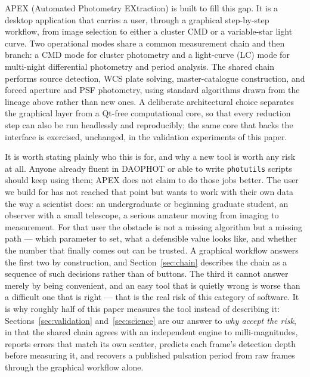 \documentclass[fleqn,usenatbib]{mnras}
\begin{document}
APEX (Automated Photometry EXtraction) is built to fill this gap. It is a desktop application that carries a user, through a graphical step-by-step workflow, from image selection to either a cluster CMD or a variable-star light curve. Two operational modes share a common measurement chain and then branch: a CMD mode for cluster photometry and a light-curve (LC) mode for multi-night differential photometry and period analysis. The shared chain performs source detection, WCS plate solving, master-catalogue construction, and forced aperture and PSF photometry, using standard algorithms drawn from the lineage above rather than new ones. A deliberate architectural choice separates the graphical layer from a Qt-free computational core, so that every reduction step can also be run headlessly and reproducibly; the same core that backs the interface is exercised, unchanged, in the validation experiments of this paper.

It is worth stating plainly who this is for, and why a new tool is worth any risk at all. Anyone already fluent in DAOPHOT or able to write \texttt{photutils} scripts should keep using them; APEX does not claim to do those jobs better. The user we build for has not reached that point but wants to work with their own data the way a scientist does: an undergraduate or beginning graduate student, an observer with a small telescope, a serious amateur moving from imaging to measurement. For that user the obstacle is not a missing algorithm but a missing path --- which parameter to set, what a defensible value looks like, and whether the number that finally comes out can be trusted. A graphical workflow answers the first two by construction, and Section~\ref{sec:chain} describes the chain as a sequence of such decisions rather than of buttons. The third it cannot answer merely by being convenient, and an easy tool that is quietly wrong is worse than a difficult one that is right --- that is the real risk of this category of software. It is why roughly half of this paper measures the tool instead of describing it: Sections~\ref{sec:validation} and~\ref{sec:science} are our answer to \emph{why accept the risk}, in that the shared chain agrees with an independent engine to milli-magnitudes, reports errors that match its own scatter, predicts each frame's detection depth before measuring it, and recovers a published pulsation period from raw frames through the graphical workflow alone.
\end{document}
